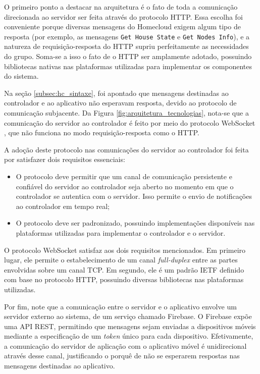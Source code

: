 O primeiro ponto a destacar na arquitetura é o fato de toda a comunicação direcionada ao servidor ser feita através do protocolo HTTP. Essa escolha foi conveniente porque diversas mensagens do Homecloud exigem algum tipo de resposta (por exemplo, as mensagens \texttt{Get House State} e \texttt{Get Nodes Info}), e a natureza de requisição-resposta do HTTP supriu perfeitamente as necessidades do grupo. Soma-se a isso o fato de o HTTP ser amplamente adotado, possuindo bibliotecas nativas nas plataformas utilizadas para implementar os componentes do sistema.

Na seção \ref{subsec:hc_sintaxe}, foi apontado que mensagens destinadas ao controlador e ao aplicativo não esperavam resposta, devido ao protocolo de comunicação subjacente. Da Figura \ref{fig:arquitetura_tecnologias}, nota-se que a comunicação do servidor ao controlador é feito por meio do protocolo WebSocket \cite{rfc6455}, que não funciona no modo requisição-resposta como o HTTP.

A adoção deste protocolo nas comunicações do servidor ao controlador foi feita por satisfazer dois requisitos essenciais:
\begin{itemize}
	\item O protocolo deve permitir que um canal de comunicação persistente e confiável do servidor ao controlador seja aberto no momento em que o controlador se autentica com o servidor. Isso permite o envio de notificações ao controlador em tempo real;
	\item O protocolo deve ser padronizado, possuindo implementações disponíveis nas plataformas utilizadas para implementar o controlador e o servidor.
\end{itemize}

O protocolo WebSocket satisfaz aos dois requisitos mencionados. Em primeiro lugar, ele permite o estabelecimento de um canal \textit{full-duplex} entre as partes envolvidas sobre um canal TCP. Em segundo, ele é um padrão IETF definido com base no protocolo HTTP, possuindo diversas bibliotecas nas plataformas utilizadas.

Por fim, note que a comunicação entre o servidor e o aplicativo envolve um servidor externo ao sistema, de um serviço chamado Firebase. O Firebase expõe uma API REST, permitindo que mensagens sejam enviadas a dispositivos móveis mediante a especificação de um \textit{token} único para cada dispositivo. Efetivamente, a comunicação do servidor de aplicação com o aplicativo móvel é unidirecional através desse canal, justificando o porquê de não se esperarem respostas nas mensagens destinadas ao aplicativo.

